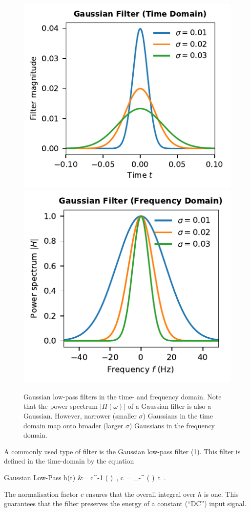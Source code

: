 \documentclass[10pt,letterpaper,oneside]{article}
\begin{document}
\begin{figure}
	\centering
	\includegraphics{media/gaussian_filters.pdf}
	\includegraphics{media/gaussian_filters_freq.pdf}
	\caption{Gaussian low-pass filters in the time- and frequency domain. Note that the power spectrum $|H(\omega)|$ of a Gaussian filter is also a Gaussian. However, narrower (smaller $\sigma$) Gaussians in the time domain map onto broader (larger $\sigma$) Gaussians in the frequency domain.}
	\label{fig:gaussian_filters}
\end{figure}

A commonly used type of filter is the Gaussian low-pass filter (\cref{fig:gaussian_filters}). This filter is defined in the time-domain by the equation
\begin{ImportantEqn}{Gaussian Low-Pass}
	h(t) &= c^{-1} \exp\left( \right) \,, \quad {} c = \int_{-\infty}^{\infty} \exp\left( \right) \,t \,.
\end{ImportantEqn}
The normalisation factor $c$ ensures that the overall integral over $h$ is one. This guarantees that the filter preserves the energy of a constant (\enquote{DC}) input signal.
\end{document}
